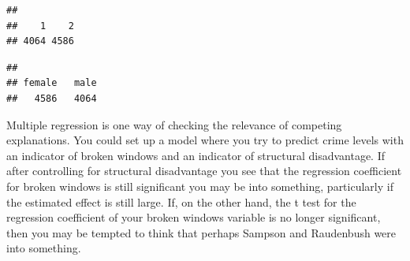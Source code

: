 \documentclass[
]{book}
\newenvironment{Shaded}{\begin{snugshade}}{\end{snugshade}}
\newcommand{\AttributeTok}[1]{\textcolor[rgb]{0.77,0.63,0.00}{#1}}
\newcommand{\CommentTok}[1]{\textcolor[rgb]{0.56,0.35,0.01}{\textit{#1}}}
\newcommand{\ConstantTok}[1]{\textcolor[rgb]{0.00,0.00,0.00}{#1}}
\newcommand{\DecValTok}[1]{\textcolor[rgb]{0.00,0.00,0.81}{#1}}
\newcommand{\FunctionTok}[1]{\textcolor[rgb]{0.00,0.00,0.00}{#1}}
\newcommand{\NormalTok}[1]{#1}
\newcommand{\OtherTok}[1]{\textcolor[rgb]{0.56,0.35,0.01}{#1}}
\newcommand{\SpecialCharTok}[1]{\textcolor[rgb]{0.00,0.00,0.00}{#1}}
\newcommand{\StringTok}[1]{\textcolor[rgb]{0.31,0.60,0.02}{#1}}
\begin{document}
\begin{Shaded}
\end{Shaded}

\begin{verbatim}
## 
##    1    2 
## 4064 4586
\end{verbatim}

\begin{Shaded}
\end{Shaded}

\begin{verbatim}
## 
## female   male 
##   4586   4064
\end{verbatim}

Multiple regression is one way of checking the relevance of competing explanations. You could set up a model where you try to predict crime levels with an indicator of broken windows and an indicator of structural disadvantage. If after controlling for structural disadvantage you see that the regression coefficient for broken windows is still significant you may be into something, particularly if the estimated effect is still large. If, on the other hand, the t test for the regression coefficient of your broken windows variable is no longer significant, then you may be tempted to think that perhaps Sampson and Raudenbush were into something.
\end{document}
